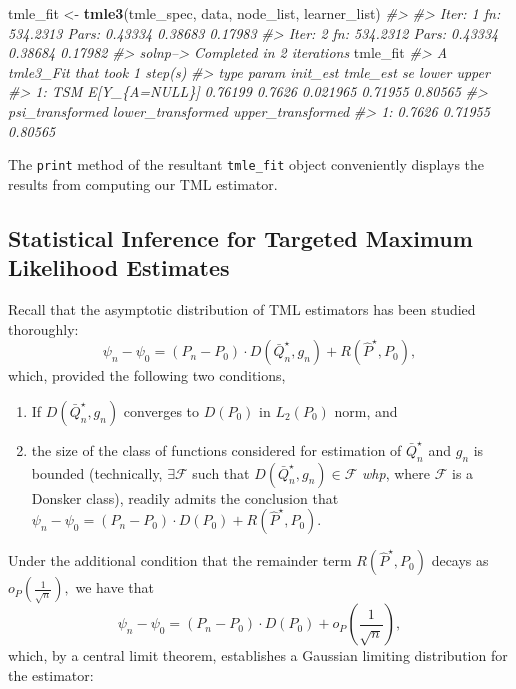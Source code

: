 \documentclass[12pt, krantz2,]{book}
\newenvironment{Shaded}{\begin{snugshade}}{\end{snugshade}}
\newcommand{\CommentTok}[1]{\textcolor[rgb]{0.56,0.35,0.01}{\textit{#1}}}
\newcommand{\KeywordTok}[1]{\textcolor[rgb]{0.13,0.29,0.53}{\textbf{#1}}}
\newcommand{\NormalTok}[1]{#1}
\newcommand{\StringTok}[1]{\textcolor[rgb]{0.31,0.60,0.02}{#1}}
\providecommand{\tightlist}{%
  \setlength{\itemsep}{0pt}\setlength{\parskip}{0pt}}
\theoremstyle{definition}
\theoremstyle{definition}
\theoremstyle{definition}
\newcommand{\1}{\mathbbm{1}}
\begin{document}
\begin{Shaded}
\begin{Highlighting}[]
\NormalTok{tmle_fit <-}\StringTok{ }\KeywordTok{tmle3}\NormalTok{(tmle_spec, data, node_list, learner_list)}
\CommentTok{#> }
\CommentTok{#> Iter: 1 fn: 534.2313  Pars:  0.43334 0.38683 0.17983}
\CommentTok{#> Iter: 2 fn: 534.2312  Pars:  0.43334 0.38684 0.17982}
\CommentTok{#> solnp--> Completed in 2 iterations}
\NormalTok{tmle_fit}
\CommentTok{#> A tmle3_Fit that took 1 step(s)}
\CommentTok{#>    type         param init_est tmle_est       se   lower   upper}
\CommentTok{#> 1:  TSM E[Y_\{A=NULL\}]  0.76199   0.7626 0.021965 0.71955 0.80565}
\CommentTok{#>    psi_transformed lower_transformed upper_transformed}
\CommentTok{#> 1:          0.7626           0.71955           0.80565}
\end{Highlighting}
\end{Shaded}

The \texttt{print} method of the resultant \texttt{tmle\_fit} object conveniently displays the
results from computing our TML estimator.

\hypertarget{statistical-inference-for-targeted-maximum-likelihood-estimates}{%
\subsection{Statistical Inference for Targeted Maximum Likelihood Estimates}\label{statistical-inference-for-targeted-maximum-likelihood-estimates}}

Recall that the asymptotic distribution of TML estimators has been studied
thoroughly:
\[\psi_n - \psi_0 = (P_n - P_0) \cdot D(\bar{Q}_n^{\star}, g_n) +
R(\hat{P}^{\star}, P_0),\]
which, provided the following two conditions,

\begin{enumerate}
\def\labelenumi{\arabic{enumi}.}
\tightlist
\item
  If \(D(\bar{Q}_n^{\star}, g_n)\) converges to \(D(P_0)\) in \(L_2(P_0)\) norm, and
\item
  the size of the class of functions considered for estimation of
  \(\bar{Q}_n^{\star}\) and \(g_n\) is bounded (technically, \(\exists \mathcal{F}\)
  such that \(D(\bar{Q}_n^{\star}, g_n) \in \mathcal{F}\) \emph{whp}, where
  \(\mathcal{F}\) is a Donsker class),
  readily admits the conclusion that
  \(\psi_n - \psi_0 = (P_n - P_0) \cdot D(P_0) + R(\hat{P}^{\star}, P_0)\).
\end{enumerate}

Under the additional condition that the remainder term \(R(\hat{P}^{\star}, P_0)\)
decays as \(o_P \left( \frac{1}{\sqrt{n}} \right),\) we have that
\[\psi_n - \psi_0 = (P_n - P_0) \cdot D(P_0) + o_P \left( \frac{1}{\sqrt{n}}
\right),\]
which, by a central limit theorem, establishes a Gaussian limiting distribution
for the estimator:
\end{document}
